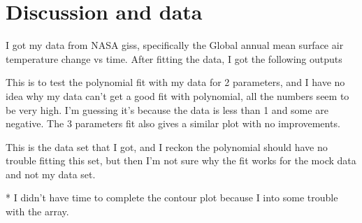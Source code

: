 \documentclass{article}
\begin{document}
\section{Discussion and data}
I got my data from NASA giss, specifically the Global annual mean surface air temperature change vs time. After fitting the data, I got the following outputs
\begin{figure}[H]
\end{figure}
This is to test the polynomial fit with my data for 2 parameters, and I have no idea why my data can't get a good fit with polynomial, all the numbers seem to be very high. I'm guessing it's because the data is less than 1 and some are negative. The 3 parameters fit also gives a similar plot with no improvements.

\begin{figure}[H]
\end{figure}
This is the data set that I got, and I reckon the polynomial should have no trouble fitting this set, but then I'm not sure why the fit works for the mock data and not my data set.

* I didn't have time to complete the contour plot because I into some trouble with the array.
\end{document}
